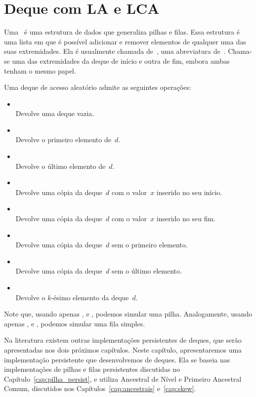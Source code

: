 \documentclass[../../main.tex]{subfiles}
\begin{document}
\chapter{Deque com LA e LCA} \label{cap:deque1_persist}

Uma~ é uma estrutura de dados que generaliza pilhas e filas. Essa estrutura é uma lista em que é possível adicionar e remover elementos de qualquer uma das suas extremidades. Ela é usualmente chamada de~, uma abreviatura de~.
Chama-se uma das extremidades da deque de início e outra de fim, embora ambas tenham o mesmo papel.

Uma deque de acesso aleatório admite as seguintes operações:

\begin{itemize}
	\item {}
	      \\ Devolve uma deque vazia.
	\item {}
	      \\ Devolve o primeiro elemento de~$d$.
	\item {}
	      \\ Devolve o último elemento de~$d$.
	\item {}
	      \\ Devolve uma cópia da deque~$d$ com o valor~$x$ inserido no seu início.
	\item {}
	      \\ Devolve uma cópia da deque~$d$ com o valor~$x$ inserido no seu fim.
	\item {}
	      \\ Devolve uma cópia da deque~$d$ sem o primeiro elemento.
	\item {}
	      \\ Devolve uma cópia da deque~$d$ sem o último elemento.
	\item {}
	      \\ Devolve o $k$-ésimo elemento da deque~$d$.
\end{itemize}

Note que, usando apenas ,  e , podemos simular uma pilha. Analogamente, usando apenas ,  e , podemos simular uma fila simples.

Na literatura existem outras implementações persistentes de deques, que serão apresentadas nos dois próximos capítulos. Neste capítulo, apresentaremos uma implementação persistente que desenvolvemos de deques. Ela se baseia nas implementações de pilhas e filas persistentes discutidas no Capítulo~\ref{cap:pilha_persist}, e utiliza Ancestral de Nível e Primeiro Ancestral Comum, discutidos nos Capítulos~\ref{cap:ancestrais} e~\ref{cap:skew}.
\end{document}
